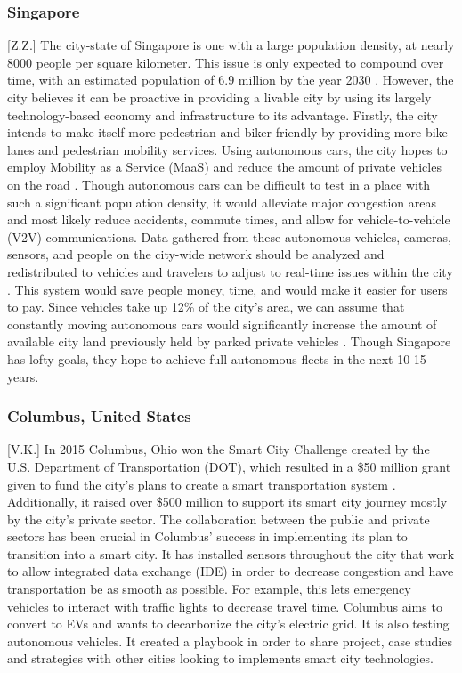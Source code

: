 \documentclass[12pt]{article}                       %
\begin{document}
\subsubsection{Singapore}[Z.Z.]
The city-state of Singapore is one with a large population density, at nearly 8000 people per square kilometer. This issue is only expected to compound over time, with an estimated population of 6.9 million by the year 2030 \cite{2016SmartSingapore}. However, the city believes it can be proactive in providing a livable city by using its largely technology-based economy and infrastructure to its advantage. Firstly, the city intends to make itself more pedestrian and biker-friendly by providing more bike lanes and pedestrian mobility services. Using autonomous cars, the city hopes to employ Mobility as a Service (MaaS) and reduce the amount of private vehicles on the road \cite{Huiling2017AISingapore}. Though autonomous cars can be difficult to test in a place with such a significant population density, it would alleviate major congestion areas and most likely reduce accidents, commute times, and allow for vehicle-to-vehicle (V2V) communications. Data gathered from these autonomous vehicles, cameras, sensors, and people on the city-wide network should be analyzed and redistributed to vehicles and travelers to adjust to real-time issues within the city \cite{2016SmartSingapore}. This system would save people money, time, and would make it easier for users to pay. Since vehicles take up 12\% of the city's area, we can assume that constantly moving autonomous cars would significantly increase the amount of available city land previously held by parked private vehicles \cite{Huiling2017AISingapore}. Though Singapore has lofty goals, they hope to achieve full autonomous fleets in the next 10-15 years.

\subsubsection{Columbus, United States}[V.K.]
In 2015 Columbus, Ohio won the Smart City Challenge created by the U.S. Department of Transportation (DOT), which resulted in a \$50 million grant given to fund the city's plans to create a smart transportation system \cite{2016ColumbusChallenge}. Additionally, it raised over \$500 million to support its smart city journey mostly by the city's private sector. The collaboration between the public and private sectors has been crucial in Columbus' success in implementing its plan to transition into a smart city. It has installed sensors throughout the city that work to allow integrated data exchange (IDE) in order to decrease congestion and  have transportation be as smooth as possible. For example, this lets emergency vehicles to interact with traffic lights to decrease travel time. Columbus aims to convert to EVs and wants to decarbonize the city's electric grid. It is also testing autonomous vehicles. It created a playbook in order to share project, case studies and strategies with other cities looking to implements smart city technologies.
\end{document}
